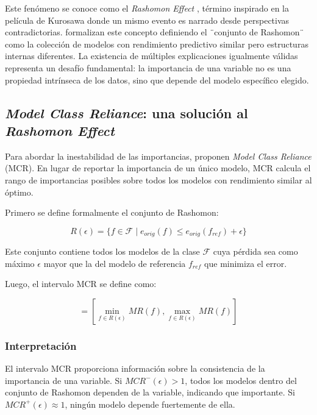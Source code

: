 Este fenómeno se conoce como el \textit{Rashomon Effect} \cite{breiman_2001}, término inspirado en la película de Kurosawa donde un mismo evento es narrado desde perspectivas contradictorias. \cite{fischer_2019} formalizan este concepto definiendo el ¨conjunto de Rashomon¨ como la colección de modelos con rendimiento predictivo similar pero estructuras internas diferentes. La existencia de múltiples explicaciones igualmente válidas representa un desafío fundamental: la importancia de una variable no es una propiedad intrínseca de los datos, sino que depende del modelo específico elegido.

\subsection{\textit{Model Class Reliance}: una solución al \textit{Rashomon Effect}} 

Para abordar la inestabilidad de las importancias, \cite{fischer_2019} proponen \textit{Model Class Reliance} (MCR). En lugar de reportar la importancia de un único modelo, MCR calcula el rango de importancias posibles sobre todos los modelos con rendimiento similar al óptimo.

Primero se define formalmente el conjunto de Rashomon:

\begin{equation}
R(\epsilon) = \{f \in \mathcal{F} \mid e_{orig}(f) \le e_{orig}(f_{ref}) + \epsilon \}    
\end{equation}

Este conjunto contiene todos los modelos de la clase $\mathcal{F}$ cuya pérdida sea como máximo $\epsilon$ mayor que la del modelo de referencia $f_{ref}$ que minimiza el error.

Luego, el intervalo MCR se define como:

\begin{equation}
[MCR^{-}(\epsilon), MCR^{+}(\epsilon)]=[\min_{f\in R(\epsilon)}MR(f), \max_{f\in R(\epsilon)}MR(f)]    
\end{equation}

\subsubsection{Interpretación}
El intervalo MCR proporciona información sobre la consistencia de la importancia de una variable. Si $MCR^{-}(\epsilon) > 1$, todos los modelos dentro del conjunto de Rashomon dependen de la variable, indicando que importante. Si $MCR^{+}(\epsilon) \approx 1$, ningún modelo depende fuertemente de ella.

